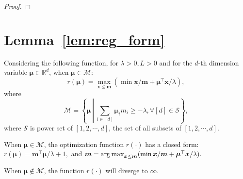 \begin{proof}
    

    
    
\end{proof}



\section{Lemma~\ref{lem:reg_form}}
\begin{lemma}\label{lem:reg_form}
Considering the following function, for $\lambda>0, L>0$ and for the $d$-th dimension variable $\bm{\mu}\in\mathbb{R}^d$, when $\bm{\mu}\in\mathcal{M}$:
\begin{equation}
    r(\bm{\mu}) = \max_{\bm{x}\leq \bm{m}} (\min {\bm{x}}/\bm{m}+\bm{\mu}^{\top}\bm{x}/\lambda),
\end{equation}
where 
\[
    \mathcal{M} =\left\{\bm{\mu} ~\left|~ \sum_{i\in [d]} \bm{\mu}_im_i \ge -\lambda, \forall [d]\in \mathcal{S}\right.\right\},
\]  
where $\mathcal{S}$ is power set of $[1,2,\cdots, d]$, \ie the set of all subsets of $[1,2,\cdots, d]$. 

When $\bm{\mu}\in\mathcal{M}$, the optimization function $r(\cdot)$ has a closed form:
$
    r(\bm{\mu}) = \bm{m}^{\top}\bm{\mu}/\lambda + 1,
$
and
$
    \bm{m} = \operatorname*{arg\,max}_{\bm{x}\leq \bm{m}} (\min {\bm{x}}/\bm{m}+\bm{\mu}^{\top}\bm{x}/\lambda).
$

When $\bm{\mu} \notin\mathcal{M}$, the function $r(\cdot)$ will diverge to $\infty$.
\end{lemma}

